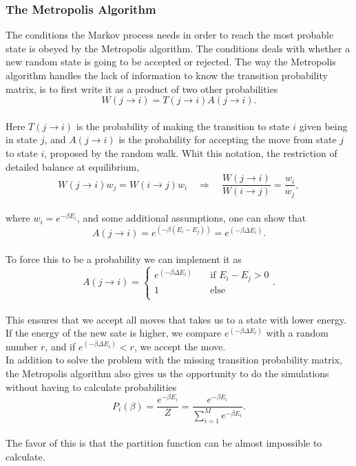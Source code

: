\documentclass[12pt]{article}
\begin{document}
\begin{flushleft}
\subsubsection{The Metropolis Algorithm}
The conditions the Markov process needs in order to reach the most probable state is obeyed by the Metropolis algorithm. The conditions deals with whether a new random state is going to be accepted or rejected. The way the Metropolis algorithm handles the lack of information to know the transition probability matrix, is to first write it as a product of two other probabilities
\vspace{5mm}
$$W(j\rightarrow i) = T(j\rightarrow i)A(j\rightarrow i).$$\\
\vspace{5mm}
Here $T(j\rightarrow i)$ is the probability of making the transition to state $i$ given being in state $j$, and $A(j\rightarrow i)$ is the probability for accepting the move from state $j$ to state $i$, proposed by the random walk. Whit this notation, the restriction of detailed balance at equilibrium,
$$W(j\rightarrow i)w_j = W(i\rightarrow j)w_i \quad\Rightarrow\quad\frac{W(j\rightarrow i)}{W(i\rightarrow j)} = \frac{w_i}{w_j},$$\\
where $w_i = e^{-\beta E_i}$, and some additional assumptions, one can show that 
\vspace{5mm}
$$A(j\rightarrow i) = e^{(-\beta(E_i - E_j))} = e^{(-\beta\Delta E_i)}.$$\\
\vspace{5mm}
To force this to be a probability we can implement it as 
\vspace{5mm}
$$A(j\rightarrow i) = 
  \begin{cases}
    e^{(-\beta\Delta E_i)}       & \quad \text{if } E_i - E_j > 0\\
    1  & \quad \text{else}\\
  \end{cases}.$$\\
  \vspace{5mm}
This ensures that we accept all moves that takes us to a state with lower energy. If the energy of the new sate is higher, we compare $e^{(-\beta\Delta E_i)}$ with a random number $r$, and if $e^{(-\beta\Delta E_i)}<r$, we accept the move.\\
\vspace{5mm}
In addition to solve the problem with the missing transition probability matrix, the Metropolis algorithm also gives us the opportunity to do the simulations without having to calculate probabilities 
\vspace{5mm}
$$P_i(\beta) = \frac{e^{-\beta E_i}}{Z} =\frac{e^{-\beta E_i}}{\sum\limits_{i=1}^{M}e^{-\beta E_i}}.$$\\
\vspace{5mm}
The favor of this is that the partition function can be almost impossible to calculate.


\end{flushleft}
\end{document}
